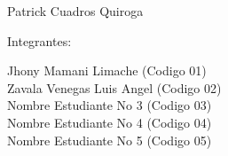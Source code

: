 \documentclass[12pt,letterpaper]{article}
\begin{document}
\begin{titlepage}
\begin{center}
\vspace*{0.1in}
\begin{large}
 Patrick Cuadros Quiroga\\
\end{large}

\vspace*{0.2in}
\vspace*{0.1in}
\begin{large}
Integrantes: \\
\begin{flushleft}
Jhony Mamani Limache		\hfill	(Codigo 01) \\
Zavala Venegas Luis Angel 		\hfill	(Codigo 02) \\
Nombre Estudiante No 3          	\hfill	(Codigo 03) \\
Nombre Estudiante No 4    	\hfill	(Codigo 04) \\
Nombre Estudiante No 5       	\hfill	(Codigo 05) \\
\end{flushleft}
\end{large}
\end{center}

\end{titlepage}


\tableofcontents %
\thispagestyle{empty} %
\newpage
\setcounter{page}{1} %











\end{document}
